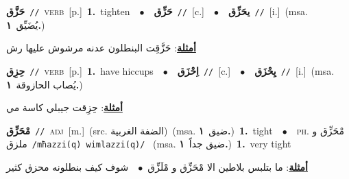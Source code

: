\documentclass[10pt,a4paper,twoside]{article} %
\begin{document}
\begin{multicols}{2}
{\setlength\topsep{0pt}\textbf{\foreignlanguage{arabic}{حَزَّق}}\ {\color{gray}\texttt{//}\color{black}}\ \textsc{verb}\ [p.]\ \textbf{1.}~tighten\ \ $\bullet$\ \ \setlength\topsep{0pt}\textbf{\foreignlanguage{arabic}{حَزِّق}}\ {\color{gray}\texttt{//}\color{black}}\ [c.]\ \ $\bullet$\ \ \setlength\topsep{0pt}\textbf{\foreignlanguage{arabic}{يحَزِّق}}\ {\color{gray}\texttt{//}\color{black}}\ [i.]\ \color{gray}(msa. \foreignlanguage{arabic}{يُضَيِّق}~\foreignlanguage{arabic}{\textbf{١.}})\color{black}\  \begin{flushright}\color{gray}\foreignlanguage{arabic}{\textbf{\underline{\foreignlanguage{arabic}{أمثلة}}}: حَزَّقِت البنطلون عدنه مرشوش عليها رش}\end{flushright}\color{black}} \vspace{2mm}

{\setlength\topsep{0pt}\textbf{\foreignlanguage{arabic}{حِزِق}}\ {\color{gray}\texttt{//}\color{black}}\ \textsc{verb}\ [p.]\ \textbf{1.}~have hiccups\ \ $\bullet$\ \ \setlength\topsep{0pt}\textbf{\foreignlanguage{arabic}{اِحْزَق}}\ {\color{gray}\texttt{//}\color{black}}\ [c.]\ \ $\bullet$\ \ \setlength\topsep{0pt}\textbf{\foreignlanguage{arabic}{يِحْزَق}}\ {\color{gray}\texttt{//}\color{black}}\ [i.]\ \color{gray}(msa. \foreignlanguage{arabic}{يُصاب الحازوقة}~\foreignlanguage{arabic}{\textbf{١.}})\color{black}\  \begin{flushright}\color{gray}\foreignlanguage{arabic}{\textbf{\underline{\foreignlanguage{arabic}{أمثلة}}}: حِزِقت جيبلي كاسة مي}\end{flushright}\color{black}} \vspace{2mm}

{\setlength\topsep{0pt}\textbf{\foreignlanguage{arabic}{مْحَزِّق}}\ {\color{gray}\texttt{//}\color{black}}\ \textsc{adj}\ [m.]\ (src. \color{gray}\foreignlanguage{arabic}{الضفة الغربية}\color{black})\ \color{gray}(msa. \foreignlanguage{arabic}{ضيق}~\foreignlanguage{arabic}{\textbf{١.}})\color{black}\ \textbf{1.}~tight\ \ $\bullet$\ \ \textsc{ph.} \color{gray} \foreignlanguage{arabic}{مْحَزِّق و ملزق}\color{black}\ {\color{gray}\texttt{/{\sffamily mħazzi(q) wimlazzi(q)}/}\color{black}}\ \color{gray} (msa. \foreignlanguage{arabic}{ضيق جداً}~\foreignlanguage{arabic}{\textbf{١.}})\color{black}\ \textbf{1.}~very tight\  \begin{flushright}\color{gray}\foreignlanguage{arabic}{\textbf{\underline{\foreignlanguage{arabic}{أمثلة}}}: ما بتلبس بلاطين الا مْحَزِّق و مْلَزِّق\ $\bullet$\ \  شوف كيف بنطلونه محزق كثير}\end{flushright}\color{black}} \vspace{2mm}


\end{multicols}
\end{document}
